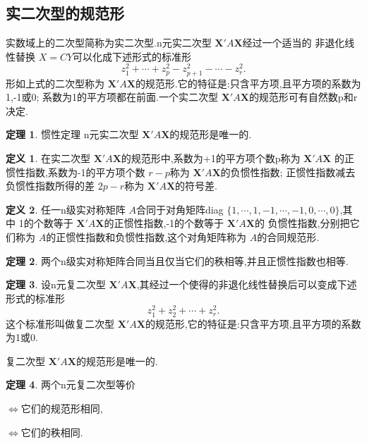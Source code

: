 \documentclass[a4paper,11pt]{article}%
\theoremstyle{remark}
\theoremstyle{definition}
\newtheorem{theorem}{定理}[section]
\theoremstyle{definition}
\newtheorem*{definition}{定义}
\theoremstyle{plain}
\begin{document}
\subsection{实二次型的规范形}
实数域上的二次型简称为实二次型.n元实二次型 $\mathbf{X}'A\mathbf{X}$经过一个适当的
非退化线性替换 $X=CY$可以化成下述形式的标准形
\[z_1^2+\cdots+z^2_p-z^2_{p+1}-\cdots-z^2_r.\]
形如上式的二次型称为 $\mathbf{X}'A\mathbf{X}$的规范形.它的特征是:只含平方项,且平方项的系数为1,-1或0;
系数为1的平方项都在前面.一个实二次型 $\mathbf{X}'A\mathbf{X}$的规范形可有自然数p和r决定.
\begin{theorem}{惯性定理}
    n元实二次型 $\mathbf{X}'A\mathbf{X}$的规范形是唯一的.
\end{theorem}
\begin{definition}
    在实二次型 $\mathbf{X}'A\mathbf{X}$的规范形中,系数为+1的平方项个数p称为 $\mathbf{X}'A\mathbf{X}$
    的正惯性指数,系数为-1的平方项个数 $r-p$称为 $\mathbf{X}'A\mathbf{X}$的负惯性指数;
    正惯性指数减去负惯性指数所得的差 $2p-r$称为 $\mathbf{X}'A\mathbf{X}$的符号差.
\end{definition}
\begin{definition}
    任一n级实对称矩阵 $A$合同于对角矩阵diag $\{1,\cdots,1,-1,\cdots,-1,0,\cdots,0\}$,其中
    1的个数等于 $\mathbf{X}'A\mathbf{X}$的正惯性指数,-1的个数等于 $\mathbf{X}'A\mathbf{X}$的
    负惯性指数,分别把它们称为 $A$的正惯性指数和负惯性指数,这个对角矩阵称为 $A$的合同规范形.
\end{definition}
\begin{theorem}
    两个n级实对称矩阵合同当且仅当它们的秩相等,并且正惯性指数也相等.
\end{theorem}
\begin{theorem}
    设n元复二次型 $\mathbf{X}'A\mathbf{X}$,其经过一个使得的非退化线性替换后可以变成下述形式的标准形
    \[z^2_1+z^2_2+\cdots+z^2_r.\]
    这个标准形叫做复二次型 $\mathbf{X}'A\mathbf{X}$的规范形,它的特征是:只含平方项,且平方项的系数为1或0.

    复二次型 $\mathbf{X}'A\mathbf{X}$的规范形是唯一的.
\end{theorem}
\begin{theorem}
    两个n元复二次型等价

    $\Leftrightarrow $它们的规范形相同,
     
    $\Leftrightarrow$它们的秩相同.
\end{theorem}
\end{document}
